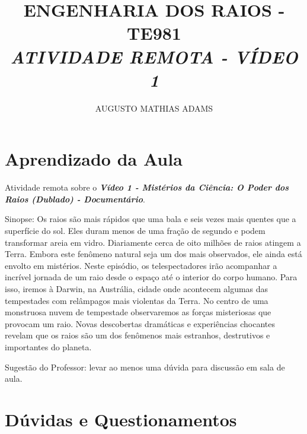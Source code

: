 \documentclass[a4paper, 12pt, onecolumn,singlespacing]{article}
\title{\normalsize{ENGENHARIA DOS RAIOS - TE981}\\ \huge{\textbf\textit{{ATIVIDADE REMOTA - VÍDEO 1}}\\}}
\author{\small{AUGUSTO MATHIAS ADAMS}}
\begin{document}
	
	\maketitle
	
	\section{Aprendizado da Aula}
	
	Atividade remota sobre o \textbf{\textit{Vídeo 1 - Mistérios da Ciência: O Poder dos Raios (Dublado) - Documentário}}.
	
	Sinopse: Os raios são mais rápidos que uma bala e seis vezes mais quentes que a superfície do sol. Eles duram menos de uma fração de segundo e podem transformar areia em vidro. Diariamente cerca de oito milhões de raios atingem a Terra. Embora este fenômeno natural seja um dos mais observados, ele ainda está envolto em mistérios. Neste episódio, os telespectadores irão acompanhar a incrível jornada de um raio desde o espaço até o interior do corpo humano. Para isso, iremos à Darwin, na Austrália, cidade onde acontecem algumas das tempestades com relâmpagos mais violentas da Terra. No centro de uma monstruosa nuvem de tempestade observaremos as forças misteriosas que provocam um raio. Novas descobertas dramáticas e experiências chocantes revelam que os raios são um dos fenômenos mais estranhos, destrutivos e importantes do planeta.
	
	Sugestão do Professor: levar ao menos uma dúvida para discussão em sala de aula.
	
	\section{Dúvidas e Questionamentos}
	
\end{document}
